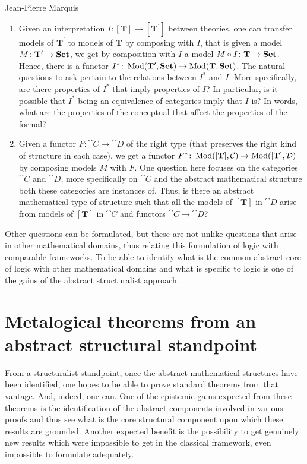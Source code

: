 \begin{artengenv}{Jean-Pierre Marquis}
\begin{enumerate}
\item Given an interpretation \( I\colon [\mathbf{T}] \rightarrow [\mathbf{T}^{\prime}] \) between theories, one can transfer models of \( \mathbf{T}^{\prime} \) to models of \( \mathbf{T} \) by composing with \(I \), that is given a model \( M\colon \mathbf{T}^{\prime} \rightarrow \mathbf{Set} \), we get by composition with \( I \) a model \( M \circ I\colon \mathbf{T} \rightarrow \mathbf{Set} \). Hence, there is a functor \( I^{\ast}\colon \operatorname{\mathrm{Mod}}(\mathbf{T}^{\prime}, \mathbf{Set}) \rightarrow \operatorname{\mathrm{Mod}}(\mathbf{T}, \mathbf{Set}) \). The natural questions to ask pertain to the relations between \( I^{\ast} \) and \( I \). More specifically, are there properties of  \( I^{\ast} \) that imply properties of \( I \)? In particular, is it possible that \( I^{\ast} \) being an equivalence of categories imply that \( I \) is? In words, what are the properties of the conceptual that affect the properties of the formal? 

\item Given a functor \( F\colon \cat{C} \rightarrow \cat{D} \) of the right type (that preserves the right kind of structure in each case), we get a functor \( F^{\ast}\colon \operatorname{\mathrm{Mod}}([\mathbf{T}], \mathcal{C}) \rightarrow \operatorname{\mathrm{Mod}}([\mathbf{T}], \mathcal{D}) \) by composing models \( M \) with \( F \). One question here focuses on the categories \( \cat{C}\) and \( \cat{D} \), more specifically on \( \cat{C} \) and the abstract mathematical structure both these categories are instances of. Thus, is there an abstract mathematical type of structure such that all the models of  \( [\mathbf{T}] \) in \( \cat{D} \) arise from models of  \( [\mathbf{T}] \) in   \( \cat{C} \) and functors \( \cat{C} \rightarrow \cat{D} \)?
\end{enumerate}

Other questions can be formulated, but these are not unlike questions that arise in other mathematical domains, thus relating this formulation of logic with comparable frameworks. To be able to identify what is the common abstract core of logic with other mathematical domains and what is specific to logic is one of the gains of the abstract structuralist approach.


\section{Metalogical theorems from an abstract structural standpoint}

From a structuralist standpoint, once the abstract mathematical structures have been identified, one hopes to be able to prove standard theorems from that vantage. And, indeed, one can. One of the epistemic gains expected from these theorems is the identification of the abstract components involved in various proofs and thus see what is the core structural component upon which these results are grounded. Another expected benefit is the possibility to get genuinely new results which were impossible to get in the classical framework, even impossible to formulate adequately.


\end{artengenv}
